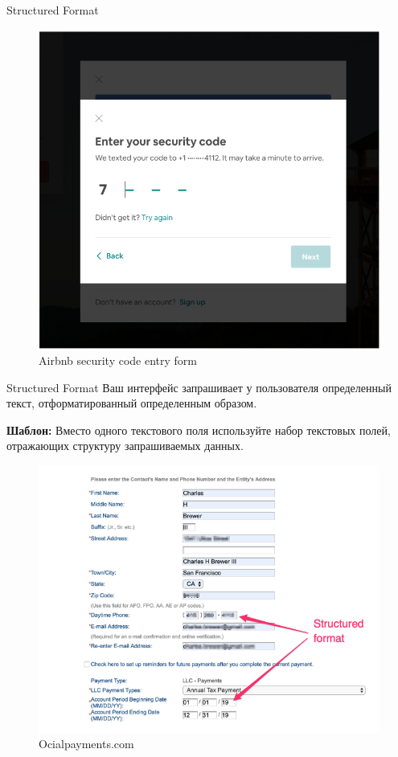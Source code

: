 \documentclass{beamer}
\begin{document}
\begin{frame}[t]{Structured Format}
	\begin{figure}[h]
		\centering
		\includegraphics[scale=0.35]{images/lec08-pic35.png}
		\caption{Airbnb security code entry form}
	\end{figure}
\end{frame}

\begin{frame}[t]{Structured Format}
	Ваш интерфейс запрашивает у пользователя определенный текст, отформатированный определенным образом.
	
	\textbf{Шаблон:} Вместо одного текстового поля используйте набор текстовых полей, отражающих структуру запрашиваемых данных.
	\begin{figure}[h]
		\centering
		\includegraphics[scale=0.3]{images/lec08-pic36.png}
		\caption{Ocialpayments.com}
	\end{figure}
\end{frame}
\end{document}
